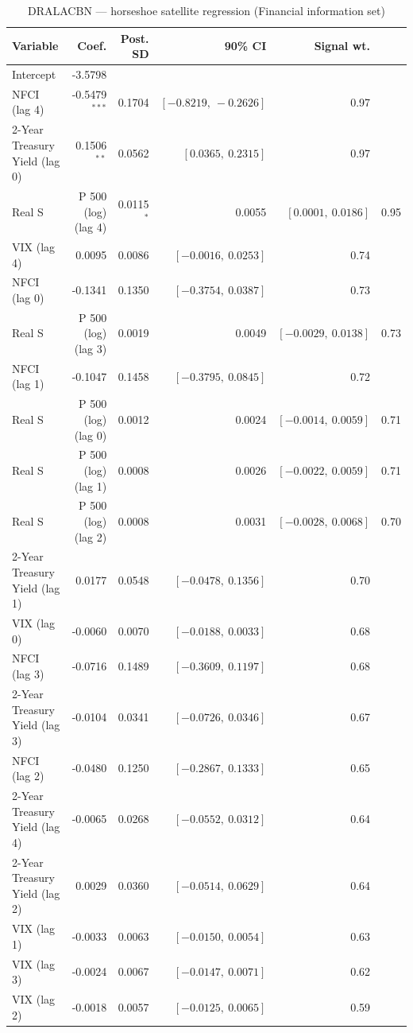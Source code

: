 \begin{table}[!htbp]
\centering
\caption{DRALACBN --- horseshoe satellite regression (Financial information set)}
\label{tab:dralacbn_financial_horseshoe}
\begin{tabular}{lrrrr}
\toprule
Variable & Coef. & Post. SD & 90\% CI & Signal wt. \\
\midrule
Intercept & -3.5798 & & & \\
NFCI (lag 4) & -0.5479$^{***}$ & 0.1704 & $[-0.8219,\ -0.2626]$ & 0.97 \\
2-Year Treasury Yield (lag 0) & 0.1506$^{**}$ & 0.0562 & $[0.0365,\ 0.2315]$ & 0.97 \\
Real S&P 500 (log) (lag 4) & 0.0115$^{*}$ & 0.0055 & $[0.0001,\ 0.0186]$ & 0.95 \\
VIX (lag 4) & 0.0095 & 0.0086 & $[-0.0016,\ 0.0253]$ & 0.74 \\
NFCI (lag 0) & -0.1341 & 0.1350 & $[-0.3754,\ 0.0387]$ & 0.73 \\
Real S&P 500 (log) (lag 3) & 0.0019 & 0.0049 & $[-0.0029,\ 0.0138]$ & 0.73 \\
NFCI (lag 1) & -0.1047 & 0.1458 & $[-0.3795,\ 0.0845]$ & 0.72 \\
Real S&P 500 (log) (lag 0) & 0.0012 & 0.0024 & $[-0.0014,\ 0.0059]$ & 0.71 \\
Real S&P 500 (log) (lag 1) & 0.0008 & 0.0026 & $[-0.0022,\ 0.0059]$ & 0.71 \\
Real S&P 500 (log) (lag 2) & 0.0008 & 0.0031 & $[-0.0028,\ 0.0068]$ & 0.70 \\
2-Year Treasury Yield (lag 1) & 0.0177 & 0.0548 & $[-0.0478,\ 0.1356]$ & 0.70 \\
VIX (lag 0) & -0.0060 & 0.0070 & $[-0.0188,\ 0.0033]$ & 0.68 \\
NFCI (lag 3) & -0.0716 & 0.1489 & $[-0.3609,\ 0.1197]$ & 0.68 \\
2-Year Treasury Yield (lag 3) & -0.0104 & 0.0341 & $[-0.0726,\ 0.0346]$ & 0.67 \\
NFCI (lag 2) & -0.0480 & 0.1250 & $[-0.2867,\ 0.1333]$ & 0.65 \\
2-Year Treasury Yield (lag 4) & -0.0065 & 0.0268 & $[-0.0552,\ 0.0312]$ & 0.64 \\
2-Year Treasury Yield (lag 2) & 0.0029 & 0.0360 & $[-0.0514,\ 0.0629]$ & 0.64 \\
VIX (lag 1) & -0.0033 & 0.0063 & $[-0.0150,\ 0.0054]$ & 0.63 \\
VIX (lag 3) & -0.0024 & 0.0067 & $[-0.0147,\ 0.0071]$ & 0.62 \\
VIX (lag 2) & -0.0018 & 0.0057 & $[-0.0125,\ 0.0065]$ & 0.59 \\

\end{tabular}
\end{table}
